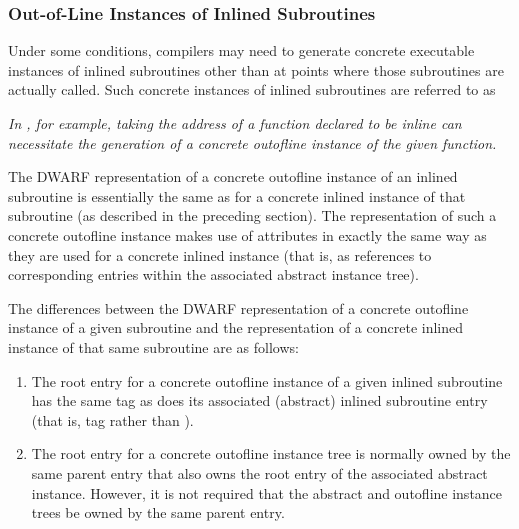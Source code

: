 \subsubsection{Out-of-Line Instances of Inlined Subroutines}
\label{chap:outoflineinstancesofinlinedsubroutines}
Under some conditions, compilers may need to generate concrete
executable instances of inlined subroutines other than at
points where those subroutines are actually called. Such
concrete instances of inlined subroutines are referred to as

\textit{In , for example, 
taking the address of a function declared
to be inline can necessitate the generation of a concrete
out\dash of\dash line instance of the given function.}

The DWARF representation of a concrete out\dash of\dash line instance
of an inlined subroutine is essentially the same as for a
concrete inlined instance of that subroutine (as described in
the preceding section). The representation of such a concrete
out\dash of\dash line 
instance 
\hypertarget{chap:DWATabstractoriginoutoflineinstance}{}
makes use of 
\DWATabstractorigin{}
attributes in exactly the same way as they are used for
a concrete inlined instance (that is, as references to
corresponding entries within the associated abstract instance
tree).

The differences between the DWARF representation of a
concrete out\dash of\dash line instance of a given subroutine and the
representation of a concrete inlined instance of that same
subroutine are as follows:

\begin{enumerate}[1. ]
\item  The root entry for a concrete out\dash of\dash line instance
of a given inlined subroutine has the same tag as does its
associated (abstract) inlined subroutine entry (that is, tag
\DWTAGsubprogram{} rather than \DWTAGinlinedsubroutine).

\item The root entry for a concrete out\dash of\dash line instance tree
is normally owned by the same parent entry that also owns
the root entry of the associated abstract instance. However,
it is not required that the abstract and out\dash of\dash line instance
trees be owned by the same parent entry.

\end{enumerate}

